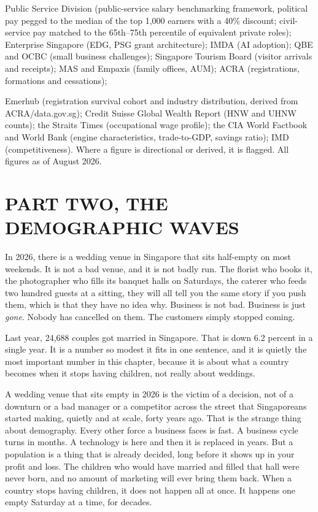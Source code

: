 \documentclass[10pt,twoside,openany]{memoir}
\begin{document}
{{{{{{{{{{{{{{Public Service Division (public-service salary benchmarking framework,
political pay pegged to the median of the top 1,000 earners with a 40\%
discount; civil-service pay matched to the 65th--75th percentile of
equivalent private roles); Enterprise Singapore (EDG, PSG grant
architecture); IMDA (AI adoption); QBE and OCBC (small business
challenges); Singapore Tourism Board (visitor arrivals and receipts);
MAS and Empaxis (family offices, AUM); ACRA (registrations, formations
and cessations);

Emerhub (registration survival cohort and industry distribution, derived
from ACRA/data.gov.sg); Credit Suisse Global Wealth Report (HNW and UHNW
counts); the Straits Times (occupational wage profile); the CIA World
Factbook and World Bank (engine characteristics, trade-to-GDP, savings
ratio); IMD (competitiveness). Where a figure is directional or derived,
it is flagged. All figures as of August 2026.

\part{PART TWO, THE DEMOGRAPHIC
WAVES}\label{part-two-the-demographic-waves}

In 2026, there is a wedding venue in Singapore that sits half-empty on
most weekends. It is not a bad venue, and it is not badly run. The
florist who books it, the photographer who fills its banquet halls on
Saturdays, the caterer who feeds two hundred guests at a sitting, they
will all tell you the same story if you push them, which is that they
have no idea why. Business is not bad. Business is just \emph{gone}.
Nobody has cancelled on them. The customers simply stopped coming.

Last year, 24,688 couples got married in Singapore. That is down 6.2
percent in a single year. It is a number so modest it fits in one
sentence, and it is quietly the most important number in this chapter,
because it is about what a country becomes when it stops having
children, not really about weddings.

A wedding venue that sits empty in 2026 is the victim of a decision, not
of a downturn or a bad manager or a competitor across the street that
Singaporeans started making, quietly and at scale, forty years ago. That
is the strange thing about demography. Every other force a business
faces is fast. A business cycle turns in months. A technology is here
and then it is replaced in years. But a population is a thing that is
already decided, long before it shows up in your profit and loss. The
children who would have married and filled that hall were never born,
and no amount of marketing will ever bring them back. When a country
stops having children, it does not happen all at once. It happens one
empty Saturday at a time, for decades.

}}}}}}}}}}}}}}
\end{document}
